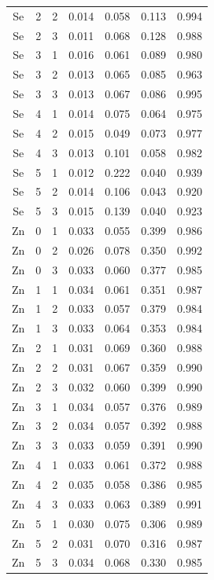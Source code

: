 \documentclass[ms, hidelinks]{uncgdissertationexp3}
\theoremstyle{plain}
\theoremstyle{definition}
\theoremstyle{remark}
\begin{document}
\begin{longtable}{ccccccc}
  Se & 2 & 2 & 0.014 & 0.058 & 0.113 & 0.994\\
  \rowcolor{gray!6}  Se & 2 & 3 & 0.011 & 0.068 & 0.128 & 0.988\\
  Se & 3 & 1 & 0.016 & 0.061 & 0.089 & 0.980\\
  \rowcolor{gray!6}  Se & 3 & 2 & 0.013 & 0.065 & 0.085 & 0.963\\
  Se & 3 & 3 & 0.013 & 0.067 & 0.086 & 0.995\\
  \rowcolor{gray!6}  Se & 4 & 1 & 0.014 & 0.075 & 0.064 & 0.975\\
  Se & 4 & 2 & 0.015 & 0.049 & 0.073 & 0.977\\
  \rowcolor{gray!6}  Se & 4 & 3 & 0.013 & 0.101 & 0.058 & 0.982\\
  Se & 5 & 1 & 0.012 & 0.222 & 0.040 & 0.939\\
  \rowcolor{gray!6}  Se & 5 & 2 & 0.014 & 0.106 & 0.043 & 0.920\\
  Se & 5 & 3 & 0.015 & 0.139 & 0.040 & 0.923\\
  \rowcolor{gray!6}  Zn & 0 & 1 & 0.033 & 0.055 & 0.399 & 0.986\\
  Zn & 0 & 2 & 0.026 & 0.078 & 0.350 & 0.992\\
  \rowcolor{gray!6}  Zn & 0 & 3 & 0.033 & 0.060 & 0.377 & 0.985\\
  Zn & 1 & 1 & 0.034 & 0.061 & 0.351 & 0.987\\
  \rowcolor{gray!6}  Zn & 1 & 2 & 0.033 & 0.057 & 0.379 & 0.984\\
  Zn & 1 & 3 & 0.033 & 0.064 & 0.353 & 0.984\\
  \rowcolor{gray!6}  Zn & 2 & 1 & 0.031 & 0.069 & 0.360 & 0.988\\
  Zn & 2 & 2 & 0.031 & 0.067 & 0.359 & 0.990\\
  \rowcolor{gray!6}  Zn & 2 & 3 & 0.032 & 0.060 & 0.399 & 0.990\\
  Zn & 3 & 1 & 0.034 & 0.057 & 0.376 & 0.989\\
  \rowcolor{gray!6}  Zn & 3 & 2 & 0.034 & 0.057 & 0.392 & 0.988\\
  Zn & 3 & 3 & 0.033 & 0.059 & 0.391 & 0.990\\
  \rowcolor{gray!6}  Zn & 4 & 1 & 0.033 & 0.061 & 0.372 & 0.988\\
  Zn & 4 & 2 & 0.035 & 0.058 & 0.386 & 0.985\\
  \rowcolor{gray!6}  Zn & 4 & 3 & 0.033 & 0.063 & 0.389 & 0.991\\
  Zn & 5 & 1 & 0.030 & 0.075 & 0.306 & 0.989\\
  \rowcolor{gray!6}  Zn & 5 & 2 & 0.031 & 0.070 & 0.316 & 0.987\\
  Zn & 5 & 3 & 0.034 & 0.068 & 0.330 & 0.985\\*
  \end{longtable}
\end{document}
